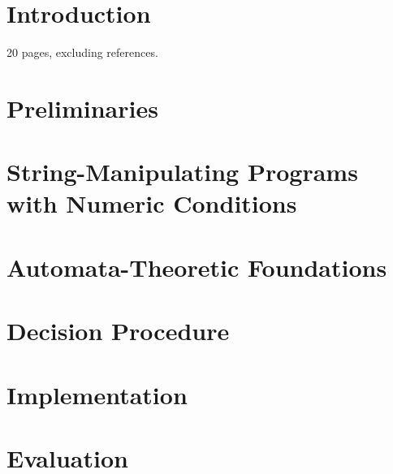 \documentclass{llncs}
\begin{document}
\section{Introduction}

20 pages, excluding references.



\section{Preliminaries}\label{sec:prel}




\section{String-Manipulating Programs with Numeric Conditions}\label{sec:logic}




\section{Automata-Theoretic Foundations}\label{sec:cefa}




\section{Decision Procedure}\label{sec:dec}




\section{Implementation}




\section{Evaluation}
\end{document}
